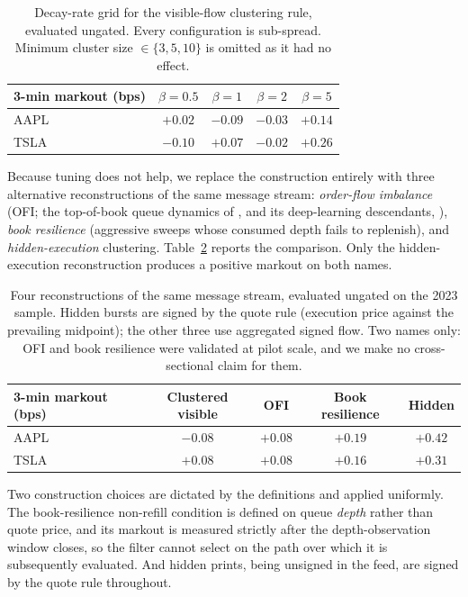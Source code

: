 \documentclass[11pt]{article}
\begin{document}
\begin{table}[htbp]
\centering
\begin{tabular}{lcccc}
\toprule
\textbf{3-min markout (bps)} & $\beta=0.5$ & $\beta=1$ & $\beta=2$ & $\beta=5$ \\
\midrule
AAPL & $+0.02$ & $-0.09$ & $-0.03$ & $+0.14$ \\
TSLA & $-0.10$ & $+0.07$ & $-0.02$ & $+0.26$ \\
\bottomrule
\end{tabular}
\caption{Decay-rate grid for the visible-flow clustering rule, evaluated ungated. Every
configuration is sub-spread. Minimum cluster size $\in \{3,5,10\}$ is omitted as it had no
effect.}
\label{tab:hawkes_grid}
\end{table}

Because tuning does not help, we replace the construction entirely with three alternative
reconstructions of the same message stream: \emph{order-flow imbalance} (OFI; the
top-of-book queue dynamics of \citealp{cont2014}, and its deep-learning descendants,
\citealp{kolm2023}), \emph{book resilience} (aggressive sweeps whose consumed depth fails
to replenish), and \emph{hidden-execution} clustering. Table~\ref{tab:altdefs} reports the
comparison. Only the hidden-execution reconstruction produces a positive markout on both
names.

\begin{table}[htbp]
\centering
\begin{tabular}{lcccc}
\toprule
\textbf{3-min markout (bps)} & Clustered visible & OFI & Book resilience & Hidden \\
\midrule
AAPL & $-0.08$ & $+0.08$ & $+0.19$ & $+0.42$ \\
TSLA & $+0.08$ & $+0.08$ & $+0.16$ & $+0.31$ \\
\bottomrule
\end{tabular}
\caption{Four reconstructions of the same message stream, evaluated ungated on the 2023
sample. Hidden bursts are signed by the quote rule (execution price against the prevailing
midpoint); the other three use aggregated signed flow. Two names only: OFI and
book resilience were validated at pilot scale, and we make no cross-sectional claim for
them.}
\label{tab:altdefs}
\end{table}

Two construction choices are dictated by the definitions and applied uniformly. The
book-resilience non-refill condition is defined on queue \emph{depth} rather than quote
price, and its markout is measured strictly after the depth-observation window closes, so
the filter cannot select on the path over which it is subsequently evaluated. And hidden
prints, being unsigned in the feed, are signed by the quote rule throughout.
\end{document}
